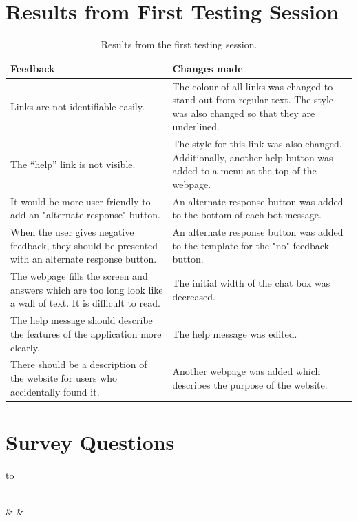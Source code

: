 \documentclass[12pt,a4paper]{article}
\newcommand{\captionstyle}[1] {
    \small{#1}
}
\begin{document}
\begin{appendices}
\section{Results from First Testing Session}\label{app:sesh1}
\begin{table}[!htb]
    \centering
    \renewcommand\arraystretch{1.6}
    \caption{\captionstyle{Results from the first testing session.}}
    \label{tbl:sesh1}
    \begin{tabularx}{\textwidth}{XX}
    \toprule
    \textbf{Feedback} & \textbf{Changes made}  \\
    \midrule
    Links are not identifiable easily. & The colour of all links was changed to stand out from regular text. The style was also  changed so that they are underlined. \\
    The \enquote{help} link is not visible. & The style for this link was also changed.  Additionally, another help button was added to a menu at the top of the webpage. \\
    It would be more user-friendly to add an "alternate response" button. & An alternate response button was added to the bottom of each bot message.\\
    When the user gives negative feedback, they should be presented with an alternate  response button. & An alternate response button was added to the template for the "no" feedback button. \\
    The webpage fills the screen and  answers which are too long look like a wall of text. It is difficult to read. & The initial width of the chat box was decreased. \\
    The help message should describe the features of the application more clearly. & The help message was edited. \\
    There should be a description of the website for users who accidentally found it. & Another webpage was added which describes the purpose of the website.\\
    \bottomrule
    \end{tabularx}
\end{table}%

\newpage
\section{Survey Questions}\label{app:surveyqs}
\renewcommand\arraystretch{1.8}
\begin{longtabu} to \textwidth {cX[1]X[1]}
    \caption{\captionstyle{The questions each tester was asked in the survey and their possible answers.}} \label{tbl:sureyqs} \\
    \toprule
     &  &  \\
    \endfirsthead


\end{longtabu}
\end{appendices}
\end{document}
